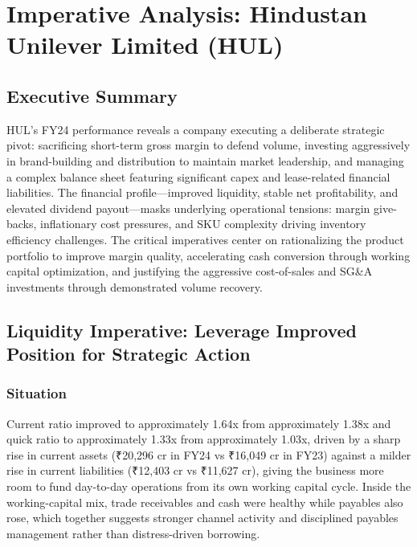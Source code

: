 \documentclass[12pt, a4paper]{report}
\begin{document}
\newpage


\section{Imperative Analysis: Hindustan Unilever Limited (HUL)}

\subsection{Executive Summary}

HUL's FY24 performance reveals a company executing a deliberate strategic pivot: sacrificing short-term gross margin to defend volume, investing aggressively in brand-building and distribution to maintain market leadership, and managing a complex balance sheet featuring significant capex and lease-related financial liabilities. The financial profile—improved liquidity, stable net profitability, and elevated dividend payout—masks underlying operational tensions: margin give-backs, inflationary cost pressures, and SKU complexity driving inventory efficiency challenges. The critical imperatives center on rationalizing the product portfolio to improve margin quality, accelerating cash conversion through working capital optimization, and justifying the aggressive cost-of-sales and SG\&A investments through demonstrated volume recovery.

\subsection{Liquidity Imperative: Leverage Improved Position for Strategic Action}

\subsubsection{Situation}
Current ratio improved to approximately 1.64x from approximately 1.38x and quick ratio to approximately 1.33x from approximately 1.03x, driven by a sharp rise in current assets (₹20,296 cr in FY24 vs ₹16,049 cr in FY23) against a milder rise in current liabilities (₹12,403 cr vs ₹11,627 cr), giving the business more room to fund day-to-day operations from its own working capital cycle. Inside the working-capital mix, trade receivables and cash were healthy while payables also rose, which together suggests stronger channel activity and disciplined payables management rather than distress-driven borrowing.
\end{document}
